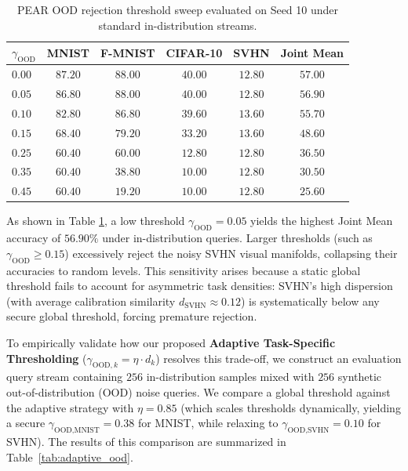 \begin{table}[h]
\caption{PEAR OOD rejection threshold sweep evaluated on Seed 10 under standard in-distribution streams.}
\label{tab:ood_sweep}
\vskip 0.15in
\begin{center}
\begin{scriptsize}
\begin{sc}
\setlength{\tabcolsep}{3pt}
\begin{tabular}{lccccc}
\toprule
$\gamma_{\text{OOD}}$ & MNIST & F-MNIST & CIFAR-10 & SVHN & Joint Mean \\
\midrule
$0.00$ & $87.20$ & $88.00$ & $40.00$ & $12.80$ & $\mathbf{57.00}$ \\
$0.05$ & $86.80$ & $88.00$ & $40.00$ & $12.80$ & $\mathbf{56.90}$ \\
$0.10$ & $82.80$ & $86.80$ & $39.60$ & $13.60$ & $\mathbf{55.70}$ \\
$0.15$ & $68.40$ & $79.20$ & $33.20$ & $13.60$ & $\mathbf{48.60}$ \\
$0.25$ & $60.40$ & $60.00$ & $12.80$ & $12.80$ & $\mathbf{36.50}$ \\
$0.35$ & $60.40$ & $38.80$ & $10.00$ & $12.80$ & $\mathbf{30.50}$ \\
$0.45$ & $60.40$ & $19.20$ & $10.00$ & $12.80$ & $\mathbf{25.60}$ \\
\bottomrule
\end{tabular}
\end{sc}
\end{scriptsize}
\end{center}
\vskip -0.1in
\end{table}

As shown in Table \ref{tab:ood_sweep}, a low threshold $\gamma_{\text{OOD}} = 0.05$ yields the highest Joint Mean accuracy of $56.90\%$ under in-distribution queries. Larger thresholds (such as $\gamma_{\text{OOD}} \ge 0.15$) excessively reject the noisy SVHN visual manifolds, collapsing their accuracies to random levels. This sensitivity arises because a static global threshold fails to account for asymmetric task densities: SVHN's high dispersion (with average calibration similarity $d_{\text{SVHN}} \approx 0.12$) is systematically below any secure global threshold, forcing premature rejection.

To empirically validate how our proposed \textbf{Adaptive Task-Specific Thresholding} ($\gamma_{\text{OOD}, k} = \eta \cdot d_k$) resolves this trade-off, we construct an evaluation query stream containing $256$ in-distribution samples mixed with $256$ synthetic out-of-distribution (OOD) noise queries. We compare a global threshold against the adaptive strategy with $\eta = 0.85$ (which scales thresholds dynamically, yielding a secure $\gamma_{\text{OOD}, \text{MNIST}} = 0.38$ for MNIST, while relaxing to $\gamma_{\text{OOD}, \text{SVHN}} = 0.10$ for SVHN). The results of this comparison are summarized in Table~\ref{tab:adaptive_ood}.

